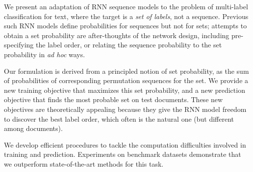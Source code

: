 We present an adaptation of RNN sequence models to the problem of multi-label classification for text, where the target is a \emph{set of labels}, not a sequence. Previous such RNN models define probabilities for sequences but not for sets; attempts to obtain a set probability are after-thoughts of the network design, including pre-specifying the label order, or relating the sequence probability to the set probability in \textit{ad hoc} ways.

Our formulation is derived from a principled notion of set probability, as the sum of probabilities of corresponding permutation sequences for the set. We provide a new training objective that maximizes this set probability, and a new prediction objective that finds the most probable set on test documents. These new objectives are theoretically appealing because they give the RNN model freedom to discover the best label order, which often is the natural one (but different among documents). 

We develop efficient procedures to tackle the computation difficulties involved in training and prediction. Experiments on benchmark datasets demonstrate that we outperform state-of-the-art methods for this task.
